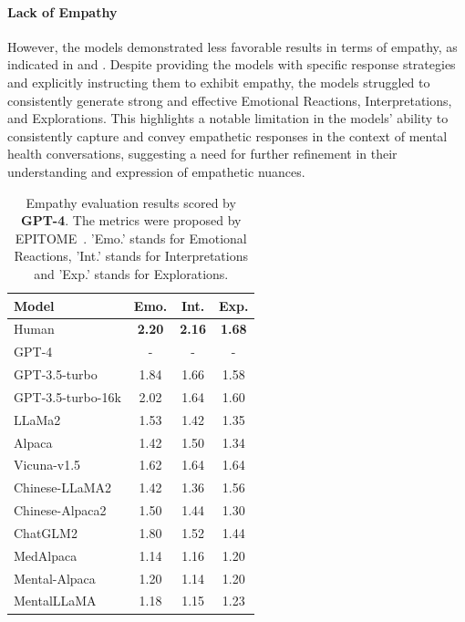 \paragraph{Lack of Empathy}However, the models demonstrated less favorable results in terms of empathy, as indicated in  and . Despite providing the models with specific response strategies and explicitly instructing them to exhibit empathy, the models struggled to consistently generate strong and effective Emotional Reactions, Interpretations, and Explorations. This highlights a notable limitation in the models' ability to consistently capture and convey empathetic responses in the context of mental health conversations, suggesting a need for further refinement in their understanding and expression of empathetic nuances.

\begin{table}[htbp]
\centering
\footnotesize
\begin{tabular}{l c c c}
\hline
\textbf{Model} & \textbf{Emo.} & \textbf{Int.} & \textbf{Exp.}\\
\hline
Human & \textbf{2.20} & \textbf{2.16} & \textbf{1.68}\\
\hline
GPT-4 & - & - & -\\
GPT-3.5-turbo & 1.84 & 1.66 & 1.58\\
GPT-3.5-turbo-16k & 2.02 & 1.64 & 1.60\\
\hline
LLaMa2 & 1.53 & 1.42 & 1.35\\
Alpaca & 1.42 & 1.50 & 1.34\\
Vicuna-v1.5 & 1.62 & 1.64 & 1.64\\
\hline
Chinese-LLaMA2 & 1.42 & 1.36 & 1.56\\
Chinese-Alpaca2 & 1.50 & 1.44 & 1.30\\
ChatGLM2 & 1.80 & 1.52 & 1.44\\
\hline
MedAlpaca & 1.14 & 1.16 & 1.20\\
Mental-Alpaca & 1.20 & 1.14 & 1.20\\
MentalLLaMA & 1.18 & 1.15 & 1.23\\
\hline
\end{tabular}
\caption{Empathy evaluation results scored by \textbf{GPT-4}. The metrics were proposed by EPITOME~\citep{sharma-etal-2020-computational}. 'Emo.' stands for Emotional Reactions, 'Int.' stands for Interpretations and 'Exp.' stands for Explorations.}
\label{tab: empathy metrics gpt4}
\end{table}

